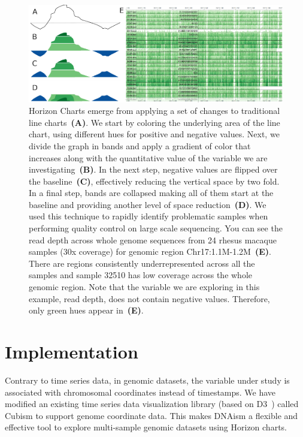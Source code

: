 \documentclass{bioinfo}
\begin{document}
\begin{figure}
\centerline{\includegraphics[width=1\textwidth,natwidth=485.65,natheight=187.53]{figure.pdf}}
\caption{
Horizon Charts emerge from applying a set of changes to traditional line
charts~\textbf{(A)}. We start by coloring the underlying area of the line chart,
using different hues for positive and negative values. Next, we divide the
graph in bands and apply a gradient of color that increases along with the
quantitative value of the variable we are investigating~\textbf{(B)}. In the
next step, negative values are flipped over the baseline~\textbf{(C)},
effectively reducing the vertical space by two fold. In a final step, bands are
collapsed making all of them start at the baseline and providing another level
of space reduction~\textbf{(D)}.  
We used this technique to rapidly identify problematic samples
when performing quality control on large scale sequencing.
You can see the read depth across whole genome sequences from 24 rhesus macaque
samples (30x coverage) for genomic region Chr17:1.1M-1.2M~\textbf{(E)}.
There are regions consistently underrepresented across all the
samples and sample 32510 has low coverage across the whole genomic region.
Note that the variable we are exploring in this example, read depth, does not
contain negative values. Therefore, only green hues appear in~\textbf{(E)}.
}\label{fig:01}
\end{figure}

\section{Implementation}

Contrary to time series data, in genomic datasets, the variable under study is
associated with chromosomal coordinates instead of timestamps. We have modified
an existing time series data visualization library (based on D3~\citep{2011-d3})
called Cubism to support genome coordinate data. This makes DNAism
a flexible and effective tool to explore multi-sample genomic datasets using
Horizon charts.
\end{document}
